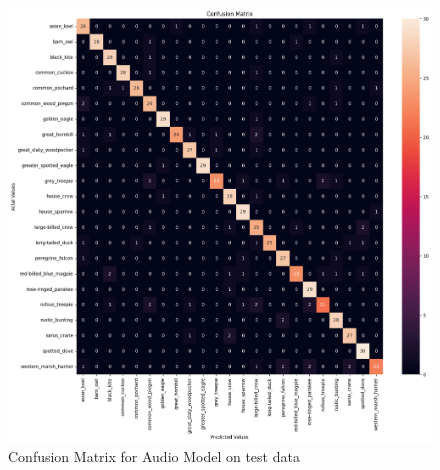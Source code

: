 \documentclass[fleqn, 10pt, twoside]{IOEGC}
\begin{document}
\begin{figure}[h]
	\centering
	\includegraphics[scale=0.4]{Graphics/audio.png}
	\caption{Confusion Matrix for Audio Model on test data}
	\label{fig:enter-label}
\end{figure}
\end{document}

